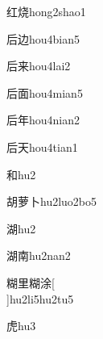 \begin{verbete}[6;10]{红烧}{hong2shao1}
\end{verbete}

\begin{verbete}[6;5]{后边}{hou4bian5}
\end{verbete}

\begin{verbete}[6;7]{后来}{hou4lai2}
\end{verbete}

\begin{verbete}[6;9]{后面}{hou4mian5}
\end{verbete}

\begin{verbete}[6;6]{后年}{hou4nian2}
\end{verbete}

\begin{verbete}[6;4]{后天}{hou4tian1}
\end{verbete}

\begin{verbete}[8]{和}{hu2}
\end{verbete}

\begin{verbete}[9;11;2]{胡萝卜}{hu2luo2bo5}
\end{verbete}

\begin{verbete}[12]{湖}{hu2}
\end{verbete}

\begin{verbete*}[12;9]{湖南}{hu2nan2}
\end{verbete*}

\begin{verbete}[15;7;15;10]{糊里糊涂}[\\]{hu2li5hu2tu5}
\end{verbete}

\begin{verbete}[8]{虎}{hu3}
\end{verbete}

